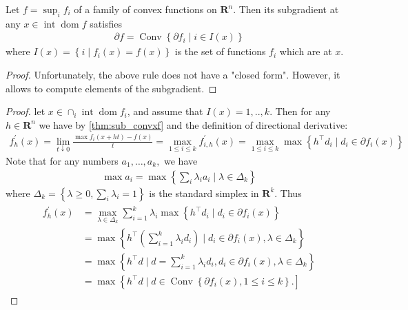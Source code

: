 \documentclass{article}
\newcommand{\inte}{\operatorname{int}}
\newcommand{\dom}{\operatorname{dom}}
\begin{document}
Let $f=\sup _{i} f_{i}$ of a  family of convex functions on $\mathbf{R}^{n}$. Then its subgradient at any $x \in \inte \dom  f$ satisfies
\begin{align*}
\partial f=\operatorname{Conv}\left\{\partial f_{i} \mid i \in I(x)\right\}
\end{align*}
where $I(x)=\left\{i\mid  f_{i}(x)=f(x)\right\}$ is the set of functions $f_{i}$ which are  at $x$.
\begin{proof}\color{ForestGreen}
Unfortunately, the above rule does not have a "closed form". However, it allows to compute elements of the subgradient.
\end{proof}
\begin{proof}\color{ForestGreen}
 let $x \in \cap_{i}\inte \dom f_{i}$, and assume that $I(x)=1, . ., k$. Then for any $h \in \mathbf{R}^{n}$ we have by \cref{thm:sub_convxf} and the definition of directional derivative:
\begin{align*}
f_{h}^{\prime}(x)=\lim _{t \downarrow 0} \frac{\max f_i(x+h t)-f(x)}{t} = \max _{1 \leq i \leq k} f_{i, h}^{\prime}(x)=\max _{1 \leq i \leq k} \max \left\{h^{\top}d_{i} \mid d_{i} \in \partial f_{i}(x)\right\}
\end{align*}
Note that for any numbers $a_{1}, \ldots, a_{k},$ we have
\begin{align*}
\max a_{i}=\max \left\{\sum_{i} \lambda_{i} a_{i} \mid \lambda \in \Delta_{k}\right\}
\end{align*}
where $\Delta_{k}=\left\{\lambda \geq 0, \sum_{i} \lambda_{i}=1\right\}$ is the standard simplex in $\mathbf{R}^{k}$. Thus
\begin{align*}
\begin{aligned}
f_{h}^{\prime}(x) &=\max _{\lambda \in \Delta_{k}} \sum_{i=1}^{k} \lambda_{i} \max \left\{h^{\top}d_{i} \mid d_{i} \in \partial f_{i}(x)\right\} \\
&=\max \left\{h^{\top}\left(\sum_{i=1}^{k} \lambda_{i} d_{i}\right) \mid d_{i} \in \partial f_{i}(x), \lambda \in \Delta_{k}\right\} \\
&=\max \left\{h^{\top}d \mid d=\sum_{i=1}^{k} \lambda_{i} d_{i}, d_{i} \in \partial f_{i}(x), \lambda \in \Delta_{k}\right\} \\
&=\max \left\{h^{\top}d \mid d \in \operatorname{Conv}\left\{\partial f_{i}(x), 1 \leq i \leq k\right\} .\right]
\end{aligned}
\end{align*}
\end{proof}

\end{document}
